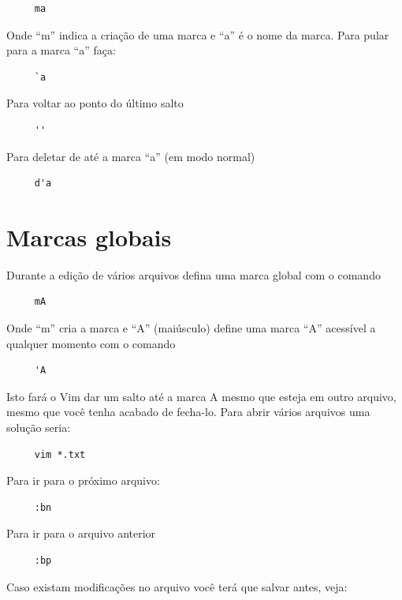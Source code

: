 \documentclass[10pt,a4paper,openany]{book}
\begin{document}
\begin{verbatim}
     ma
\end{verbatim}

Onde ``m'' indica a criação de uma marca e ``a'' é o nome da marca. Para pular para a marca ``a'' faça:

\begin{verbatim}
     `a
\end{verbatim}

Para voltar ao ponto do último salto

\begin{verbatim}
     ''
\end{verbatim}

Para deletar de até a marca ``a'' (em modo normal)

\begin{verbatim}
     d'a
\end{verbatim}

\section{Marcas globais}
Durante a edição de vários arquivos defina uma marca global com o comando

\begin{verbatim}
     mA
\end{verbatim}

Onde ``m'' cria a marca e ``A'' (maiúsculo) define uma marca ``A'' acessível a qualquer momento com o comando

\begin{verbatim}
     'A
\end{verbatim}

Isto fará o Vim dar um salto até a marca A mesmo que esteja em outro
arquivo, mesmo que você tenha acabado de fecha-lo. Para abrir vários
arquivos uma solução seria:

\begin{verbatim}
     vim *.txt
\end{verbatim}

Para ir para o próximo arquivo:

\begin{verbatim}
     :bn
\end{verbatim}

Para ir para o arquivo anterior

\begin{verbatim}
     :bp
\end{verbatim}

Caso existam modificações no arquivo você terá que salvar antes, veja: 
\end{document}
